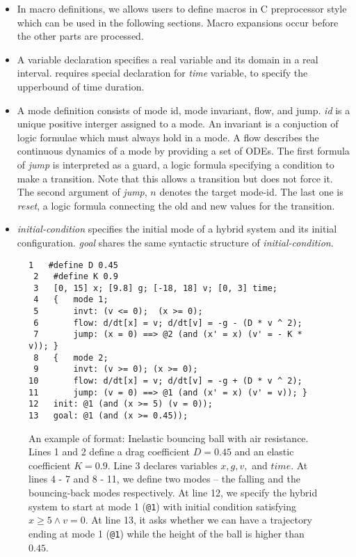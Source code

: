 \begin{itemize}
\item In macro definitions, we allows users to define macros in C
preprocessor style which can be used in the following
sections. Macro expansions occur before the other parts are processed.

\item A variable declaration specifies a real variable and its domain
  in a real interval. \dReach{} requires special declaration for
  \textit{time} variable, to specify the upperbound of time duration.

\item A mode definition consists of mode id, mode invariant, flow, and jump.
\textit{id} is a unique positive interger assigned to a mode. An
invariant is a conjuction of logic formulae which must always hold in
a mode. A flow describes the continuous dynamics of a mode by providing
a set of ODEs. The first
formula of \textit{jump} is interpreted as a guard, a logic formula
specifying a condition to make a transition. Note that this allows a
transition but does not force it. The second argument of
\textit{jump}, $n$ denotes the target mode-id. The last one is
\textit{reset}, a logic formula connecting the old and new values for
the transition.

\item \textit{initial-condition} specifies the initial mode of a hybrid
system and its initial configuration. \textit{goal} shares the same
syntactic structure of \textit{initial-condition}.
\end{itemize}
\begin{figure}
  \centering
  \begin{Verbatim}[fontfamily=courier, frame=single, framesep=1mm, fontsize=\footnotesize]
 1   #define D 0.45
 2   #define K 0.9
 3   [0, 15] x; [9.8] g; [-18, 18] v; [0, 3] time;
 4   {   mode 1;
 5       invt: (v <= 0);  (x >= 0);
 6       flow: d/dt[x] = v; d/dt[v] = -g - (D * v ^ 2);
 7       jump: (x = 0) ==> @2 (and (x' = x) (v' = - K * v)); }
 8   {   mode 2;
 9       invt: (v >= 0); (x >= 0);
10       flow: d/dt[x] = v; d/dt[v] = -g + (D * v ^ 2);
11       jump: (v = 0) ==> @1 (and (x' = x) (v' = v)); }
12   init: @1 (and (x >= 5) (v = 0));
13   goal: @1 (and (x >= 0.45));
\end{Verbatim}
\caption{An example of \drh{} format: Inelastic bouncing ball with air
  resistance. Lines 1 and 2 define a drag coefficient $D = 0.45$ and
  an elastic coefficient $K = 0.9$. Line 3 declares variables
  $x, g, v,$ and $time$. At lines 4 - 7 and 8 - 11, we define two
  modes -- the falling and the bouncing-back modes respectively. At
  line 12, we specify the hybrid system to start at mode 1
  (\texttt{@1}) with initial condition satisfying
  $x \ge 5 \land v = 0$. At line 13, it asks whether we can have
  a trajectory ending at mode 1 (\texttt{@1}) while the height of the
  ball is higher than $0.45$.}
\label{fig:bouncing-ball-drh}
\end{figure}
\vspace{-1.7em}
